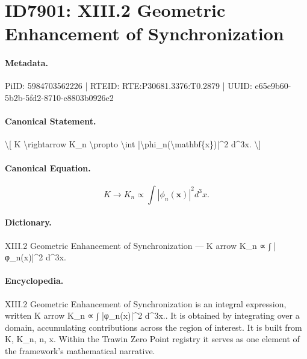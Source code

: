\section*{ID7901: XIII.2 Geometric Enhancement of Synchronization}
\paragraph{Metadata.}
PiID: 5984703562226 | RTEID: RTE:P30681.3376:T0.2879 | UUID: e65e9b60-5b2b-5fd2-8710-e8803b0926e2

\paragraph{Canonical Statement.}
\textbackslash{}[ K \textbackslash{}rightarrow K\_n \textbackslash{}propto \textbackslash{}int |\textbackslash{}phi\_n(\textbackslash{}mathbf\{x\})|\textasciicircum{}2 d\textasciicircum{}3x. \textbackslash{}]

\paragraph{Canonical Equation.}
\[
K \rightarrow K_n \propto \int |\phi_n(\mathbf{x})|^2 d^3x.
\]

\paragraph{Dictionary.}
XIII.2 Geometric Enhancement of Synchronization — K arrow K\_n ∝ ∫ |φ\_n(x)|\textasciicircum{}2 d\textasciicircum{}3x.

\paragraph{Encyclopedia.}
XIII.2 Geometric Enhancement of Synchronization is an integral expression, written K arrow K\_n ∝ ∫ |φ\_n(x)|\textasciicircum{}2 d\textasciicircum{}3x.. It is obtained by integrating over a domain, accumulating contributions across the region of interest. It is built from K, K\_n, n, x. Within the Trawin Zero Point registry it serves as one element of the framework's mathematical narrative.
